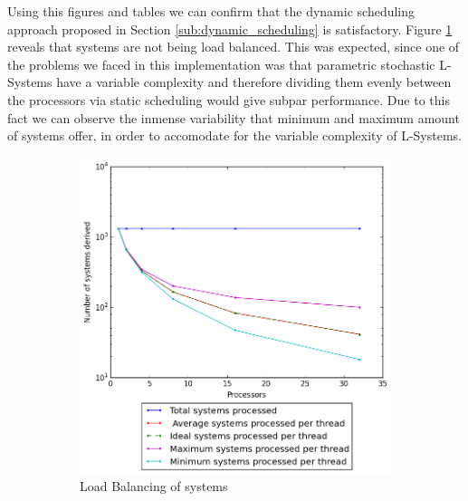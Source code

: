 \documentclass[letterpaper,twoside,11pt]{article}
\begin{document}
\begin{multicols}{2}
Using this figures and tables we can confirm that the dynamic scheduling approach proposed in Section \ref{sub:dynamic_scheduling} is satisfactory. Figure \ref{fig:Load_systems} reveals that systems are not being load balanced. This was expected, since one of the problems we faced in this implementation was that parametric stochastic L-Systems have a variable complexity and therefore dividing them evenly between the processors via static scheduling would give subpar performance. Due to this fact we can observe the inmense variability that minimum and maximum amount of systems offer, in order to accomodate for the variable complexity of L-Systems.

\begin{figure}
  \centering
  \begin{subfigure}{.5\textwidth}
    \centering
    \includegraphics[width=.99\textwidth]{../3 Analysis/Load/systemsnaive110.png}
    \caption{Load Balancing of systems}
    \label{fig:Load_systems}
  \end{subfigure}%
  \begin{subfigure}{.5\textwidth}
    \centering

\end{subfigure}
\end{figure}
\end{multicols}
\end{document}
